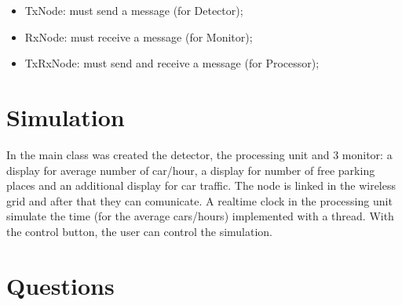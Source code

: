 \documentclass[a4paper,titlepage]{article}
\begin{document}
\begin{itemize}[noitemsep,topsep=20pt,parsep=10pt,partopsep=20pt]

\item TxNode: must send a message (for Detector);

\item RxNode: must receive a message (for Monitor);

\item TxRxNode: must send and receive a message (for Processor);

\end{itemize}



\part{Simulation}

In the main class was created the detector, the processing unit and 3 monitor: a display for average number of car/hour, a display for number of free parking places and an additional display for car traffic.
The node is linked in the wireless grid and after that they can comunicate. A realtime clock in the processing unit simulate the time (for the average cars/hours) implemented with a thread. With the control button, the user can control the simulation.


\part{Questions}
\end{document}
